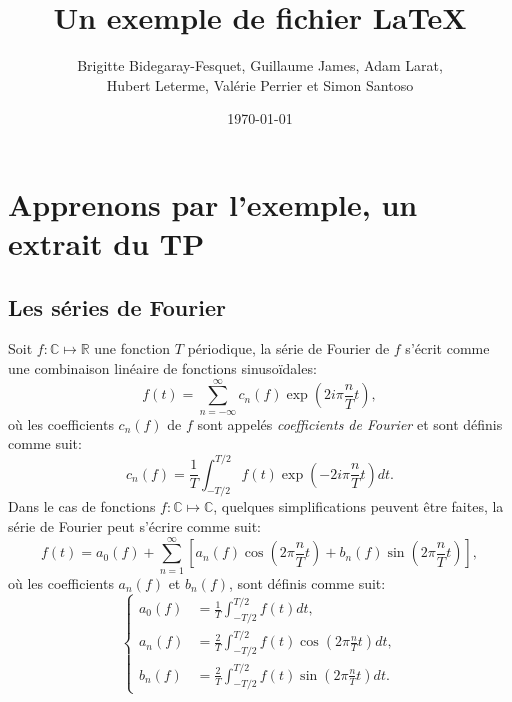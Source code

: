 \documentclass[12pt]{book}
\title{Un exemple de fichier LaTeX}
\author{Brigitte Bidegaray-Fesquet, Guillaume James, Adam Larat, \\
Hubert Leterme, Valérie Perrier et Simon Santoso}
\date{\today} %
\def\bbR{{\mathbb{C}}} %
\def\bbC{{\mathbb{R}}} %
\begin{document}
\maketitle %

\section{Apprenons par l'exemple, un extrait du TP}

\subsection{Les séries de Fourier}
Soit $f:\bbR\mapsto\bbC$ une fonction $T$ périodique, la série de Fourier de $f$ s'écrit comme une combinaison linéaire de fonctions sinusoïdales:
\begin{equation}
	f(t) = \sum_{n=-\infty}^\infty c_n(f) \exp\left(2i\pi\frac{n}{T}t\right),
\end{equation}
où les coefficients $c_n(f)$ de $f$ sont appelés \textit{coefficients de Fourier}
et sont définis comme suit:
\begin{equation}
	c_n(f) = \frac1T \int_{-T/2}^{T/2} f(t) \exp\left(-2i\pi\frac{n}{T}t\right) dt.
\end{equation}
Dans le cas de fonctions $f:\bbR\mapsto\bbR$, quelques simplifications
peuvent être faites, la série de Fourier peut s'écrire comme suit:
\begin{equation}
	f(t) = a_0(f)
    + \sum_{n=1}^\infty \left[
      a_n(f) \cos\left(2\pi\frac{n}{T}t\right)
    + b_n(f) \sin\left(2\pi\frac{n}{T}t\right)\right],
\end{equation}
où les coefficients $a_n(f)$ et $b_n(f)$, sont définis comme suit:
\begin{equation}
\label{eq:coeffs_a_et_b}
	\left\{
    \begin{aligned}
		a_0(f) & = \frac1T \int_{-T/2}^{T/2} f(t) dt, \\
		a_n(f) & = \frac2T \int_{-T/2}^{T/2} f(t) \cos\left(2\pi\frac{n}{T}t\right) dt, \\
		b_n(f) & = \frac2T \int_{-T/2}^{T/2} f(t) \sin\left(2\pi\frac{n}{T}t\right) dt.
	\end{aligned}
    \right.
\end{equation}
\end{document}
